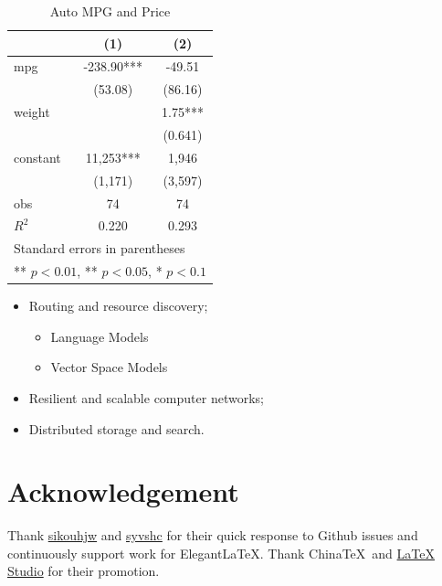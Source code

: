 \documentclass[en,hazy,blue,screen,14pt]{elegantnote}
\begin{document}
\begin{table}[htbp]
  \small
  \centering
  \caption{Auto MPG and Price \label{tab:reg}}
    \begin{tabular}{lcc}
    \toprule
                    &       (1)         &        (2)      \\
    \midrule
    mpg             &    -238.90***     &      -49.51     \\
                    &     (53.08)       &      (86.16)    \\
    weight          &                   &      1.75***    \\
                    &                   &      (0.641)    \\
    constant        &     11,253***     &       1,946     \\
                    &     (1,171)       &      (3,597)   \\
    obs             &        74         &         74     \\
    $R^2$           &      0.220        &       0.293    \\
    \bottomrule
    \multicolumn{3}{l}{\scriptsize Standard errors in parentheses} \\
    \multicolumn{3}{l}{\scriptsize *** $p<0.01$, ** $p<0.05$, * $p<0.1$} \\
    \end{tabular}%
\end{table}%


\begin{itemize}[noitemsep]
  \item Routing and resource discovery;
    \begin{itemize} 
      \item Language Models
      \item Vector Space Models
    \end{itemize}
  \item Resilient and scalable computer networks;
  \item Distributed storage and search.
\end{itemize}


\section{Acknowledgement}

Thank \href{https://github.com/sikouhjw}{sikouhjw} and \href{https://github.com/syvshc}{syvshc} for their quick response to Github issues and continuously support work for Elegant\LaTeX{}. Thank China\TeX\ and \href{http://www.latexstudio.net/}{LaTeX Studio} for their promotion. 
\end{document}
